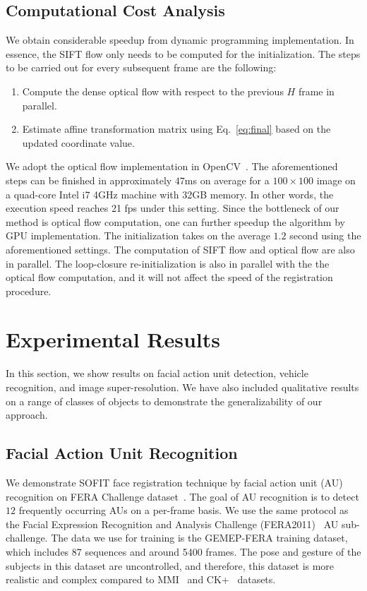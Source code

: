 \documentclass[10pt,journal]{IEEEtran}
\begin{document}
\subsection{\label{sec:time}Computational Cost Analysis}
We obtain considerable speedup from dynamic programming implementation. In essence, the SIFT flow only needs to be computed for the initialization. The steps to be carried out for every subsequent frame are the following:
\begin{enumerate}
\item Compute the dense optical flow with respect to the previous $H$ frame in parallel.
\item Estimate affine transformation matrix using Eq.~\eqref{eq:final} based on the updated coordinate value.
\end{enumerate}

We adopt the optical flow implementation in OpenCV~\cite{opencv}. The aforementioned steps can be finished in approximately $47$ms on average for a $100\times100$ image on a quad-core Intel i7 4GHz machine with 32GB memory. In other words, the execution speed reaches 21 fps under this setting. Since the bottleneck of our method is optical flow computation, one can further speedup the algorithm by GPU implementation. The initialization takes on the average $1.2$ second using the aforementioned settings. The computation of SIFT flow and optical flow are also in parallel. The loop-closure re-initialization is also in parallel with the the optical flow computation, and it will not affect the speed of the registration procedure. 


\section{\label{sec:experiment}Experimental Results}

In this section, we show results on facial action unit detection, vehicle recognition, and image super-resolution. We have also included qualitative results on a range of classes of objects to demonstrate the generalizability of our approach.

\subsection{Facial Action Unit Recognition}

We demonstrate SOFIT face registration technique by facial action unit (AU) recognition on FERA Challenge dataset~\cite{FERA11}. The goal of AU recognition is to detect $12$ frequently occurring AUs on a per-frame basis. We use the same protocol as the Facial Expression Recognition and Analysis Challenge (FERA2011)~\cite{Valstar_FERA11} AU sub-challenge. The data we use for training is the GEMEP-FERA training dataset, which includes 87 sequences and around 5400 frames. The pose and gesture of the subjects in this dataset are uncontrolled, and therefore, this dataset is more realistic and complex compared to MMI~\cite{Pantic_ICME05} and CK+~\cite{Kanade_FG00} datasets.
\end{document}
